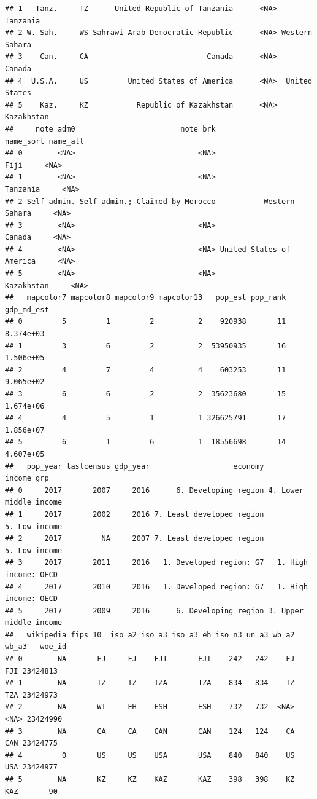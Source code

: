 \documentclass[
]{article}
\begin{document}
\begin{verbatim}
## 1   Tanz.     TZ      United Republic of Tanzania      <NA>       Tanzania
## 2 W. Sah.     WS Sahrawi Arab Democratic Republic      <NA> Western Sahara
## 3    Can.     CA                           Canada      <NA>         Canada
## 4  U.S.A.     US         United States of America      <NA>  United States
## 5    Kaz.     KZ           Republic of Kazakhstan      <NA>     Kazakhstan
##     note_adm0                        note_brk                name_sort name_alt
## 0        <NA>                            <NA>                     Fiji     <NA>
## 1        <NA>                            <NA>                 Tanzania     <NA>
## 2 Self admin. Self admin.; Claimed by Morocco           Western Sahara     <NA>
## 3        <NA>                            <NA>                   Canada     <NA>
## 4        <NA>                            <NA> United States of America     <NA>
## 5        <NA>                            <NA>               Kazakhstan     <NA>
##   mapcolor7 mapcolor8 mapcolor9 mapcolor13   pop_est pop_rank gdp_md_est
## 0         5         1         2          2    920938       11  8.374e+03
## 1         3         6         2          2  53950935       16  1.506e+05
## 2         4         7         4          4    603253       11  9.065e+02
## 3         6         6         2          2  35623680       15  1.674e+06
## 4         4         5         1          1 326625791       17  1.856e+07
## 5         6         1         6          1  18556698       14  4.607e+05
##   pop_year lastcensus gdp_year                   economy             income_grp
## 0     2017       2007     2016      6. Developing region 4. Lower middle income
## 1     2017       2002     2016 7. Least developed region          5. Low income
## 2     2017         NA     2007 7. Least developed region          5. Low income
## 3     2017       2011     2016   1. Developed region: G7   1. High income: OECD
## 4     2017       2010     2016   1. Developed region: G7   1. High income: OECD
## 5     2017       2009     2016      6. Developing region 3. Upper middle income
##   wikipedia fips_10_ iso_a2 iso_a3 iso_a3_eh iso_n3 un_a3 wb_a2 wb_a3   woe_id
## 0        NA       FJ     FJ    FJI       FJI    242   242    FJ   FJI 23424813
## 1        NA       TZ     TZ    TZA       TZA    834   834    TZ   TZA 23424973
## 2        NA       WI     EH    ESH       ESH    732   732  <NA>  <NA> 23424990
## 3        NA       CA     CA    CAN       CAN    124   124    CA   CAN 23424775
## 4         0       US     US    USA       USA    840   840    US   USA 23424977
## 5        NA       KZ     KZ    KAZ       KAZ    398   398    KZ   KAZ      -90

\end{verbatim}
\end{document}
